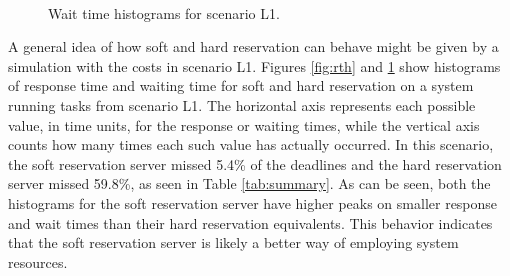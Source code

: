 \documentclass[times, 10pt,twocolumn]{article}
\begin{document}
\begin{figure}[t]
  \centering
  \\
  \caption{Wait time histograms for scenario L1.}
  \label{fig:dth}
\end{figure}

A general idea of how soft and hard reservation can behave might be
given by a simulation with the costs in scenario L1. Figures
\ref{fig:rth} and \ref{fig:dth} show histograms of response time and
waiting time for soft and hard reservation on a system running tasks
from scenario L1. The horizontal axis represents each possible value,
in time units, for the response or waiting times, while the vertical
axis counts how many times each such value has actually occurred. In
this scenario, the soft reservation server missed 5.4\% of the
deadlines and the hard reservation server missed 59.8\%, as seen in
Table \ref{tab:summary}. As can be seen, both the histograms for the
soft reservation server have higher peaks on smaller response and wait
times than their hard reservation equivalents. This behavior indicates
that the soft reservation server is likely a better way of employing
system resources.
\end{document}
